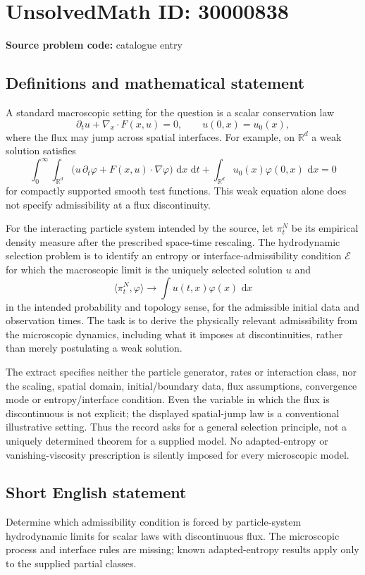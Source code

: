 \documentclass[11pt]{article}
\newcommand{\R}{\mathbb{R}}
\newcommand{\dd}{\,\mathrm{d}}
\begin{document}
\section*{UnsolvedMath ID: 30000838}
\textbf{Source problem code:} catalogue entry
\subsection{Definitions and mathematical statement}
A standard macroscopic setting for the question is a scalar conservation law
\[
\partial_t u+\nabla_x\!\cdot F(x,u)=0,\qquad u(0,x)=u_0(x),
\]
where the flux may jump across spatial interfaces. For example, on $\R^d$ a weak solution satisfies
\[
\int_0^\infty\!\int_{\R^d}
\bigl(u\,\partial_t\varphi+F(x,u)\cdot\nabla\varphi\bigr)\,\dd x\,\dd t
+\int_{\R^d}u_0(x)\varphi(0,x)\,\dd x=0
\]
for compactly supported smooth test functions. This weak equation alone does not specify admissibility at a flux discontinuity.

For the interacting particle system intended by the source, let $\pi_t^N$ be its empirical density measure after the prescribed space-time rescaling. The hydrodynamic selection problem is to identify an entropy or interface-admissibility condition $\mathcal E$ for which the macroscopic limit is the uniquely selected solution $u$ and
\[
\langle\pi_t^N,\varphi\rangle\longrightarrow
\int u(t,x)\varphi(x)\,\dd x
\]
in the intended probability and topology sense, for the admissible initial data and observation times. The task is to derive the physically relevant admissibility from the microscopic dynamics, including what it imposes at discontinuities, rather than merely postulating a weak solution.

The extract specifies neither the particle generator, rates or interaction class, nor the scaling, spatial domain, initial/boundary data, flux assumptions, convergence mode or entropy/interface condition. Even the variable in which the flux is discontinuous is not explicit; the displayed spatial-jump law is a conventional illustrative setting. Thus the record asks for a general selection principle, not a uniquely determined theorem for a supplied model. No adapted-entropy or vanishing-viscosity prescription is silently imposed for every microscopic model.
\subsection{Short English statement}
Determine which admissibility condition is forced by particle-system hydrodynamic limits for scalar laws with discontinuous flux. The microscopic process and interface rules are missing; known adapted-entropy results apply only to the supplied partial classes.
\end{document}
